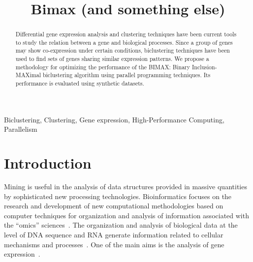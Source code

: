 \documentclass[a4paper,conference]{IEEEtran}
\renewcommand{\abstractname}{Abstract}
\begin{document}
\title{Bimax (and something else)}
\author{
\and
{} 
}

\maketitle

\renewcommand{\abstractname}{Abstract}
\begin{abstract}
Differential gene expression analysis and clustering techniques have been current tools to study the relation between a gene and biological processes. Since a group of genes may show co-expression under certain conditions, biclustering techniques have been used to find sets of genes sharing similar expression patterns. We propose a methodology for optimizing the performance of the BIMAX: Binary Inclusion-MAXimal  biclustering algorithm  using parallel programming techniques. Its performance is evaluated using synthetic datasets. 
\end{abstract}

\begin{IEEEkeywords}
Biclustering, Clustering, Gene expression, High-Performance Computing, Parallelism
\end{IEEEkeywords}
\IEEEpeerreviewmaketitle

\section{Introduction}
 Mining is useful in the analysis of data structures provided in massive quantities by sophisticated new processing technologies. Bioinformatics focuses on the research and development of new computational methodologies based on computer techniques for organization and analysis of information associated with the  ``omics'' sciences~\cite{luscombe2001bioinformatics}. The organization and analysis of biological data at the level of DNA sequence and RNA generate information related to cellular mechanisms and processes~\cite{mount2004sequence}. One of the main aims is the analysis of gene expression~\cite{griffiths2003genetica}.
\end{document}

